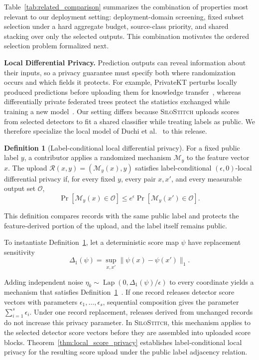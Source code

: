 \documentclass[conference]{IEEEtran}
\theoremstyle{definition}
\newtheorem{definition}{Definition}[section]
\newcommand{\Fname}{\textsc{SiloStitch}\xspace}
\newcommand{\bheading}[1]{\noindent\textbf{#1.}\xspace}
\begin{document}
Table~\ref{tab:related_comparison} summarizes the combination of properties most relevant to our deployment setting: deployment-domain screening, fixed subset selection under a hard aggregate budget, source-class priority, and shared stacking over only the selected outputs. This combination motivates the ordered selection problem formalized next.

\bheading{Local Differential Privacy}
Prediction outputs can reveal information about their inputs, so a privacy
guarantee must specify both where randomization occurs and which fields it
protects.
%
For example, PrivateKT perturbs locally produced predictions before uploading
them for knowledge transfer~\cite{qi2023privatekt}, whereas differentially
private federated trees protect the statistics exchanged while training a new
model~\cite{dpfedtree_ccs22}.
%
Our setting differs because \Fname uploads scores from selected detectors to
fit a shared classifier while treating labels as public.
%
We therefore specialize the local model of Duchi et
al.~\cite{duchi2013localprivacy} to this release.

{
\begin{definition}[Label-conditional local differential privacy]
\label{def:local_dp}
For a fixed public label $y$, a contributor applies a randomized mechanism
$\mathcal M_y$ to the feature vector $x$.
%
The upload
$\mathcal R(x,y)=(\mathcal M_y(x),y)$ satisfies label-conditional
$(\epsilon,0)$-local differential privacy if, for every fixed $y$, every pair
$x,x'$, and every measurable output set $\mathcal O$,
\begin{equation}
\Pr[\mathcal M_y(x)\in\mathcal O]
\le e^{\epsilon}\Pr[\mathcal M_y(x')\in\mathcal O].
\label{eq:local_dp_definition}
\end{equation}

This definition compares records with the same public label and protects the
feature-derived portion of the upload, and the label itself remains public.
\end{definition}
}

To instantiate Definition~\ref{def:local_dp}, let a deterministic score map
$\psi$ have replacement sensitivity
\begin{equation}
\Delta_1(\psi)=\sup_{x,x'}\lVert \psi(x)-\psi(x')\rVert_1.
\label{eq:local_l1_sensitivity}
\end{equation}

Adding independent noise
$\eta_k\sim\operatorname{Lap}(0,\Delta_1(\psi)/\epsilon)$ to every coordinate
yields a mechanism that satisfies
Definition~\ref{def:local_dp}~\cite{dwork2006calibrating}.
If one record releases detector score vectors with parameters
$\epsilon_1,\ldots,\epsilon_s$, sequential composition gives the parameter
$\sum_{i=1}^{s}\epsilon_i$.
Under one record replacement, releases derived from unchanged records do not
increase this privacy parameter.
In \Fname, this mechanism applies to the selected detector score vectors before they are assembled into uploaded score blocks.
Theorem~\ref{thm:local_score_privacy} establishes label-conditional local
privacy for the resulting score upload under the public label adjacency
relation.
\end{document}

